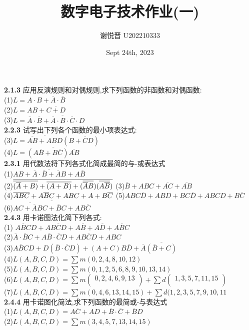 \documentclass[a4paper,11pt,UTF8]{article}
\title{数字电子技术作业(一)}
\author{谢悦晋 \quad U202210333}
\date{Sept 24th, 2023 }
\begin{document}
\maketitle
\noindent\textbf{2.1.3} 应用反演规则和对偶规则,求下列函数的非函数和对偶函数:\\
(1)$L=A\cdot B+\overline{A}\cdot\overline{B}$\\
(2)$L=AB+\overline{C+D}$\\
(3)$L=\overline{A}\cdot\overline{B}+\overline{\overline{A}\cdot B\cdot\overline{C}}\cdot D$\\
\textbf{2.2.3} 试写出下列各个函数的最小项表达式:\\
(3)$L=\overline{\overline{AB}+ABD}(B+\overline{C}D)$\\
(4)$L=\overline{(A\overline{B}+B\overline{C})\overline{AB}}$\\
\textbf{2.3.1}
用代数法将下列各式化简成最简的与-或表达式\\
(1)$\overline{AB+\overline{A}\cdot\overline{B}+\overline{A}B+A\overline{B}}$\\
(2)$\overline{\overline{(\overline{A}+B)}+\overline{(A+B)}+(\overline{\overline{A}B})(\overline{A\overline{B}})}\\$
(3)$\overline{B}+ABC+\overline{AC}+\overline{AB}$\\
(4)$\overline{ABC}+A\overline{B}C+ABC+A+B\overline{C}\\$
(5)${ABC}{\overline{D}+ABD+BC}{\overline{D}+ABCD+B}{\overline{C}}$\\
(6)$\overline{{\overline{AC+\overline{A}BC}+\overline{B}C+AB\overline{C}}}$\\
\textbf{2.4.3} 用卡诺图法化简下列各式:\\
(1) $A\overline{B}CD+AB\overline{C}D+A\overline{B}+A\overline{D}+A\overline{B}C$\\
(2)$\overline{A}\cdot\overline{B}C+A\overline{B}\cdot\overline{C}D+AB\overline{C}D+ABC$\\
(3)$
A\overline{B}CD+D(\overline{B}\cdot\overline{C}D)+(A+C)B\overline{D}+\overline{A}\overline{(\overline{B}+C)}
$\\
(4)$
L(A,B,C,D)=\sum m(0,2,4,8,10,12)
$\\
(5)$
L(A,B,C,D)=\sum m(0,1,2,5,6,8,9,10,13,14)
$\\
(6)$
L(A,B,C,D)=\sum m(\begin{matrix}{0,2,4,6,9,13}\\\end{matrix})+\sum d(\begin{matrix}{1,3,5,7,11,15}\\\end{matrix})
$\\
(7)$
L(A,B,C,D)=\sum m(0,4,6,13,14,15)+\sum d(1,2,3,5,7,9,10,11
$\\ 
\textbf{2.4.4} 用卡诺图化简法,求下列函数的最简或-与表达式\\
(1)$
L(A,B,C,D)=A\overline{C}+AD+\overline{B}\cdot\overline{C}+\overline{B}D
$\\
(2)$
L(A,B,C,D)=\sum m(3,4,5,7,13,14,15)
$\\
\end{document}
